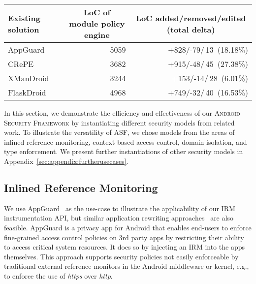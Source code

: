 \documentclass[letterpaper,twocolumn,10pt]{article}
\newcommand{\OURNAME}{\textsc{Android Security Framework}\xspace}
\newcommand{\OURSHORT}{\textsc{ASF}\xspace}
\begin{document}
\begin{table*}[t]
  \centering
\footnotesize
  \begin{tabular}{|l|r|r|}\hline
    \textbf{Existing solution} & \multicolumn{1}{|c|}{\textbf{LoC of module policy engine}} & \multicolumn{1}{|c|}{\textbf{LoC added/removed/edited (total delta)}} \\\hline
AppGuard~\cite{backes13TACAS} & 5059 & +828/-79/\,13~(18.18\%) \\\hline
CRePE~\cite{CoNgCr_10:CRePE} & 3682 & +915/-48/\,45~(27.38\%) \\\hline
XManDroid~\cite{BuDaDm_12:TowardsT} & 3244 & +153/-14/\,28~(6.01\%) \\\hline
FlaskDroid~\cite{TUD-CS-2013-0115} & 4968 & +749/-32/\,40~(16.53\%) \\\hline
  \end{tabular}
  \caption{Effort of porting different security extensions as module on our \OURNAME.}
  \label{tab:usecase:codediff}
\end{table*}


In this section, we demonstrate the efficiency and effectiveness of our \OURNAME by instantiating different security models from related work. To illustrate the versatility of \OURSHORT, we chose models from the areas of inlined reference monitoring, context-based access control, domain isolation, and type enforcement. We present further instantiations of other security models in Appendix~\ref{sec:appendix:furtherusecases}.

\subsection{Inlined Reference Monitoring~\cite{backes13TACAS}}
\label{sec:usecase:appguard}

We use AppGuard~\cite{backes13TACAS} as the use-case to illustrate the applicability of our IRM instrumentation API, but similar application rewriting approaches~\cite{Jeon2012} are also feasible. AppGuard is a privacy app for Android that enables end-users to enforce fine-grained access control policies on 3rd party apps by restricting their ability to access critical system resources. It does so by injecting an IRM into the apps themselves. This approach supports security policies not easily enforceable by traditional external reference monitors in the Android middleware or kernel, e.g., to enforce the use of \emph{https} over \emph{http}.
\end{document}
